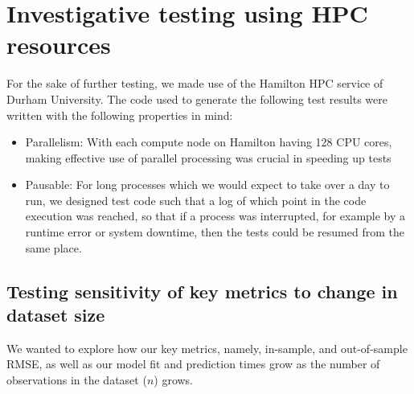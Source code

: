 \documentclass[10pt]{article}
\begin{document}
\section{Investigative testing using HPC resources}
For the sake of further testing, we made use of the Hamilton HPC service of Durham University. The code used to generate the following test results were written with the following properties in mind:
\begin{itemize}
\item Parallelism: With each compute node on Hamilton having 128 CPU cores, making effective use of parallel processing was crucial in speeding up tests
\item Pausable: For long processes which we would expect to take over a day to run, we designed test code such that a log of which point in the code execution was reached, so that if a process was interrupted, for example by a runtime error or system downtime, then the tests could be resumed from the same place.
\end{itemize}
\subsection{Testing sensitivity of key metrics to change in dataset size}
We wanted to explore how our key metrics, namely, in-sample, and out-of-sample RMSE, as well as our model fit and prediction times grow as the number of observations in the dataset ($n$) grows.
\end{document}
